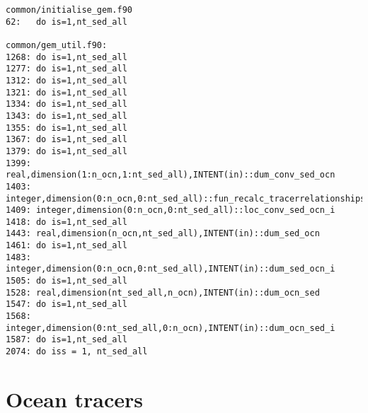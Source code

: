 \documentclass[a4paper,10pt,article]{memoir}
\begin{document}
\begin{small}
\begin{verbatim}
common/initialise_gem.f90
62:   do is=1,nt_sed_all

common/gem_util.f90:
1268: do is=1,nt_sed_all
1277: do is=1,nt_sed_all
1312: do is=1,nt_sed_all
1321: do is=1,nt_sed_all
1334: do is=1,nt_sed_all
1343: do is=1,nt_sed_all
1355: do is=1,nt_sed_all
1367: do is=1,nt_sed_all
1379: do is=1,nt_sed_all
1399: real,dimension(1:n_ocn,1:nt_sed_all),INTENT(in)::dum_conv_sed_ocn
1403: integer,dimension(0:n_ocn,0:nt_sed_all)::fun_recalc_tracerrelationships_i
1409: integer,dimension(0:n_ocn,0:nt_sed_all)::loc_conv_sed_ocn_i
1418: do is=1,nt_sed_all
1443: real,dimension(n_ocn,nt_sed_all),INTENT(in)::dum_sed_ocn
1461: do is=1,nt_sed_all
1483: integer,dimension(0:n_ocn,0:nt_sed_all),INTENT(in)::dum_sed_ocn_i
1505: do is=1,nt_sed_all
1528: real,dimension(nt_sed_all,n_ocn),INTENT(in)::dum_ocn_sed
1547: do is=1,nt_sed_all
1568: integer,dimension(0:nt_sed_all,0:n_ocn),INTENT(in)::dum_ocn_sed_i
1587: do is=1,nt_sed_all
2074: do iss = 1, nt_sed_all
\end{verbatim}
\end{small}

\section{Ocean tracers}
\end{document}
